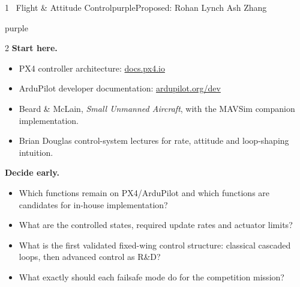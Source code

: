 \documentclass[10pt,a4paper]{article}
\begin{document}
\begin{project}{1 \, Flight \& Attitude Control}{purple}{Proposed: Rohan Lynch \textbullet{} Ash Zhang}
\begin{research}{purple}
\smallskip
\begin{multicols}{2}\RaggedRight
\textbf{Start here.}
\begin{itemize}
  \item PX4 controller architecture: \href{https://docs.px4.io/main/en/flight_stack/controller_diagrams.html}{docs.px4.io}
  \item ArduPilot developer documentation: \href{https://ardupilot.org/dev/}{ardupilot.org/dev}
  \item Beard \& McLain, \emph{Small Unmanned Aircraft}, with the MAVSim companion implementation.
  \item Brian Douglas control-system lectures for rate, attitude and loop-shaping intuition.
\end{itemize}
\columnbreak
\textbf{Decide early.}
\begin{itemize}
  \item Which functions remain on PX4/ArduPilot and which functions are candidates for in-house implementation?
  \item What are the controlled states, required update rates and actuator limits?
  \item What is the first validated fixed-wing control structure: classical cascaded loops, then advanced control as R\&D?
  \item What exactly should each failsafe mode do for the competition mission?
\end{itemize}
\end{multicols}
\end{research}
\end{project}
\end{document}
